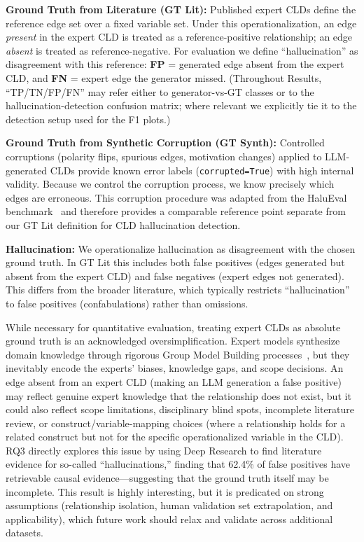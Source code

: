 \textbf{Ground Truth from Literature (GT Lit):} Published expert CLDs define the reference edge set over a fixed variable set. Under this operationalization, an edge \textit{present} in the expert CLD is treated as a reference-positive relationship; an edge \textit{absent} is treated as reference-negative. For evaluation we define ``hallucination'' as disagreement with this reference: \textbf{FP} = generated edge absent from the expert CLD, and \textbf{FN} = expert edge the generator missed. (Throughout Results, ``TP/TN/FP/FN'' may refer either to generator-vs-GT classes or to the hallucination-detection confusion matrix; where relevant we explicitly tie it to the detection setup used for the F1 plots.)

\textbf{Ground Truth from Synthetic Corruption (GT Synth):} Controlled corruptions (polarity flips, spurious edges, motivation changes) applied to LLM-generated CLDs provide known error labels (\texttt{corrupted=True}) with high internal validity. Because we control the corruption process, we know precisely which edges are erroneous. This corruption procedure was adapted from the HaluEval benchmark~\citep{li2023halueval} and therefore provides a comparable reference point separate from our GT Lit definition for CLD hallucination detection.

\textbf{Hallucination:} We operationalize hallucination as disagreement with the chosen ground truth. In GT Lit this includes both false positives (edges generated but absent from the expert CLD) and false negatives (expert edges not generated). This differs from the broader literature, which typically restricts ``hallucination'' to false positives (confabulations) rather than omissions.

While necessary for quantitative evaluation, treating expert CLDs as absolute ground truth is an acknowledged oversimplification. Expert models synthesize domain knowledge through rigorous Group Model Building processes~\citep{crielaard2024refining}, but they inevitably encode the experts' biases, knowledge gaps, and scope decisions. An edge absent from an expert CLD (making an LLM generation a false positive) may reflect genuine expert knowledge that the relationship does not exist, but it could also reflect scope limitations, disciplinary blind spots, incomplete literature review, or construct/variable-mapping choices (where a relationship holds for a related construct but not for the specific operationalized variable in the CLD). RQ3 directly explores this issue by using Deep Research to find literature evidence for so-called ``hallucinations,'' finding that 62.4\% of false positives have retrievable causal evidence---suggesting that the ground truth itself may be incomplete. This result is highly interesting, but it is predicated on strong assumptions (relationship isolation, human validation set extrapolation, and applicability), which future work should relax and validate across additional datasets.


